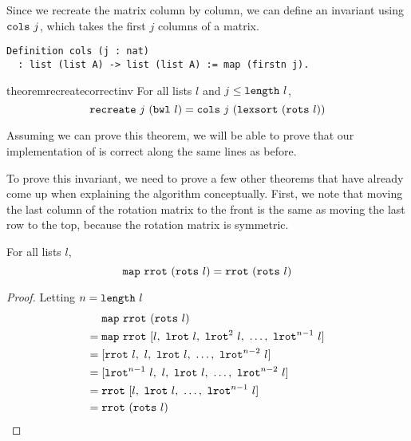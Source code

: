 \documentclass[sigplan,10pt,anonymous,review]{thesis}
\begin{document}
Since we recreate the matrix column by column, we can define an
invariant using $\texttt{\textup{cols}}~j$, which takes the first $j$ columns of a matrix.
\begin{lstlisting}
Definition cols (j : nat)
  : list (list A) -> list (list A) := map (firstn j).
\end{lstlisting}

\begin{restatable*}{theorem}{recreatecorrectinv}
  For all lists $l$ and $j \le \texttt{\textup{length}}~l$,
  \begin{equation*}
    \texttt{\textup{recreate}}~j~(\texttt{\textup{bwl}}~l) =
    \texttt{\textup{cols}}~j~(\texttt{\textup{lexsort}}~(\texttt{\textup{rots}}~l))
  \end{equation*}
\end{restatable*}

Assuming we can prove this theorem, we will be able to prove that our
implementation of  is correct along the same lines as before.

To prove this invariant, we need to prove a few other theorems that
have already come up when explaining the algorithm conceptually.
First, we note that moving the last column of the rotation matrix to the front
is the same as moving the last row to the top, because the rotation
matrix is symmetric.

\begin{theorem}
  For all lists $l$,
  \begin{equation*}
    \texttt{\textup{map}}~\texttt{\textup{rrot}}~(\texttt{\textup{rots}}~l) = \texttt{\textup{rrot}}~(\texttt{\textup{rots}}~l)
  \end{equation*}
\end{theorem}
\begin{proof}
  Letting $n = \texttt{\textup{length}}~l$
  \begin{align*}
       &\texttt{\textup{map}}~\texttt{\textup{rrot}}~(\texttt{\textup{rots}}~l) \\
    ={}&\texttt{\textup{map}}~\texttt{\textup{rrot}}~[l,~\texttt{\textup{lrot}}~l,~\texttt{\textup{lrot}}^2~l,~\ldots,~\texttt{\textup{lrot}}^{n-1}~l] \\
    ={}&[\texttt{\textup{rrot}}~l,~l,~\texttt{\textup{lrot}}~l,~\ldots,~\texttt{\textup{lrot}}^{n-2}~l] \\
    ={}&[\texttt{\textup{lrot}}^{n-1}~l,~l,~\texttt{\textup{lrot}}~l,~\ldots,~\texttt{\textup{lrot}}^{n-2}~l] \\
    ={}&\texttt{\textup{rrot}}~[l,~\texttt{\textup{lrot}}~l,~\ldots,~\texttt{\textup{lrot}}^{n-1}~l] \\
    ={}&\texttt{\textup{rrot}}~(\texttt{\textup{rots}}~l) \qedhere
  \end{align*}
\end{proof}
\end{document}
